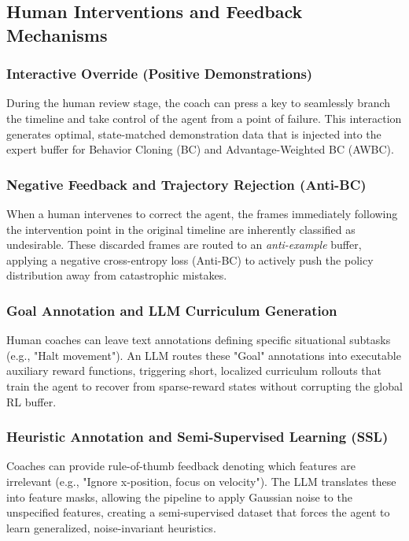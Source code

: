 \documentclass{article}
\begin{document}
\subsection{Human Interventions and Feedback Mechanisms}

\subsubsection{Interactive Override (Positive Demonstrations)}
During the human review stage, the coach can press a key to seamlessly branch the timeline and take control of the agent from a point of failure. This interaction generates optimal, state-matched demonstration data that is injected into the expert buffer for Behavior Cloning (BC) and Advantage-Weighted BC (AWBC).

\subsubsection{Negative Feedback and Trajectory Rejection (Anti-BC)}
When a human intervenes to correct the agent, the frames immediately following the intervention point in the original timeline are inherently classified as undesirable. These discarded frames are routed to an \textit{anti-example} buffer, applying a negative cross-entropy loss (Anti-BC) to actively push the policy distribution away from catastrophic mistakes.

\subsubsection{Goal Annotation and LLM Curriculum Generation}
Human coaches can leave text annotations defining specific situational subtasks (e.g., "Halt movement"). An LLM routes these "Goal" annotations into executable auxiliary reward functions, triggering short, localized curriculum rollouts that train the agent to recover from sparse-reward states without corrupting the global RL buffer.

\subsubsection{Heuristic Annotation and Semi-Supervised Learning (SSL)}
Coaches can provide rule-of-thumb feedback denoting which features are irrelevant (e.g., "Ignore x-position, focus on velocity"). The LLM translates these into feature masks, allowing the pipeline to apply Gaussian noise to the unspecified features, creating a semi-supervised dataset that forces the agent to learn generalized, noise-invariant heuristics.
\end{document}
